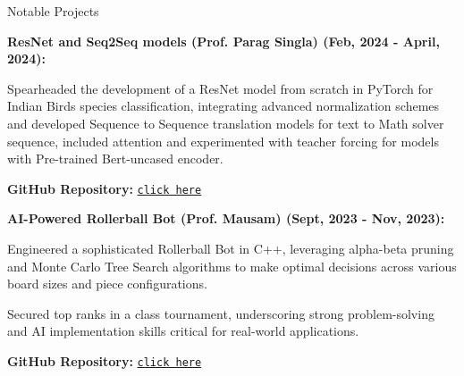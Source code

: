 \begin{rubric}{Notable Projects}

\entry*
\textbf{ResNet and Seq2Seq models (Prof. Parag Singla) (Feb, 2024 - April, 2024):}\par
Spearheaded the development of a ResNet model from scratch in PyTorch for Indian Birds species classification, integrating advanced normalization schemes and developed Sequence to Sequence translation models for text to Math solver sequence, included attention and experimented with teacher forcing for models with Pre-trained Bert-uncased encoder.\par
\textbf{GitHub Repository:} \href{https://github.com/nikhiltej5/Resnet_and_LSTMs.git}{\texttt{click here}}


    \entry*
\textbf{AI-Powered Rollerball Bot (Prof. Mausam) (Sept, 2023 - Nov, 2023):}\par
Engineered a sophisticated Rollerball Bot in C++, leveraging alpha-beta pruning and Monte Carlo Tree Search algorithms to make optimal decisions across various board sizes and piece configurations.\par
Secured top ranks in a class tournament, underscoring strong problem-solving and AI implementation skills critical for real-world applications.\par
\textbf{GitHub Repository:} \href{https://github.com/nikhiltej5/player_AI.git}{\texttt{click here}}



\end{rubric}
